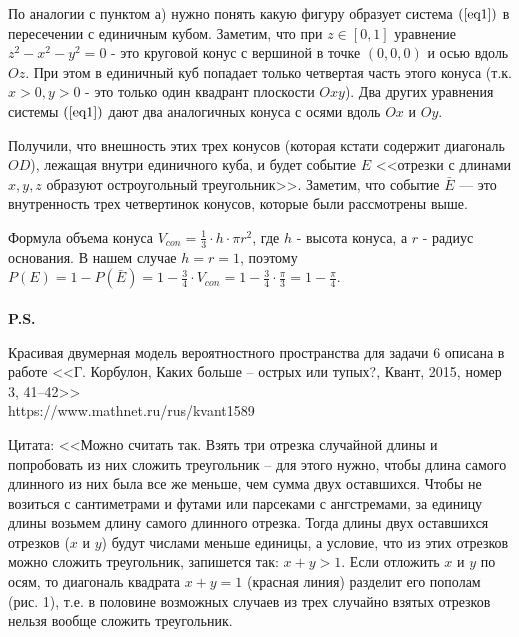 \documentclass{article}
\begin{document}
\par
По аналогии с пунктом а) нужно понять какую фигуру образует система $(\ref{eq1})$ в пересечении с единичным кубом. Заметим, что при $z\in [0, 1]$ уравнение $z^2-x^2-y^2=0$ - это круговой конус с вершиной в точке $(0,0,0)$ и осью вдоль $Oz$. При этом в единичный куб попадает только четвертая часть этого конуса (т.к. $x>0, y>0$ - это только один квадрант плоскости $Oxy$). Два других уравнения системы $(\ref{eq1})$ дают два аналогичных конуса с осями вдоль $Ox$ и $Oy$. 
\par
Получили, что внешность этих трех конусов (которая кстати содержит диагональ $OD$), лежащая внутри единичного куба, и будет событие $E$ <<отрезки с длинами $x,y,z$ образуют остроугольный треугольник>>. Заметим, что событие $\bar E$ — это внутренность трех четвертинок конусов, которые были рассмотрены выше. 
\par
Формула объема конуса $V_{con}=\frac{1}{3}\cdot h \cdot \pi r^2$, где $h$ - высота конуса, а $r$ - радиус основания. В нашем случае $h=r=1$, поэтому $P(E)=1-P(\bar E)=1-\frac{3}{4}\cdot V_{con} = 1 - \frac{3}{4}\cdot\frac{\pi}{3}=1-\frac{\pi}{4}$.
\\
\\
{\bf P.S.}
\par
Красивая двумерная модель вероятностного пространства для задачи 6 описана в работе <<Г. Корбулон, Каких больше – острых или тупых?, Квант, 2015, номер 3, 41–42>>
\\
https://www.mathnet.ru/rus/kvant1589
\\
\par
Цитата: <<Можно считать так. Взять три отрезка случайной длины и попробовать из них сложить треугольник – для этого нужно, чтобы длина самого длинного из них была все же меньше, чем сумма
двух оставшихся. Чтобы не возиться с сантиметрами и футами или парсеками с ангстремами, за единицу длины возьмем длину самого длинного отрезка. Тогда длины двух оставшихся отрезков ($x$ и $y$) будут числами меньше единицы, а условие, что из этих отрезков можно сложить треугольник, запишется так: $x + y > 1$. Если отложить $x$ и $y$ по осям, то диагональ квадрата $x + y = 1$ (красная линия) разделит его пополам (рис. 1), т.е. в половине возможных
случаев из трех случайно взятых отрезков нельзя вообще сложить треугольник.
\end{document}
